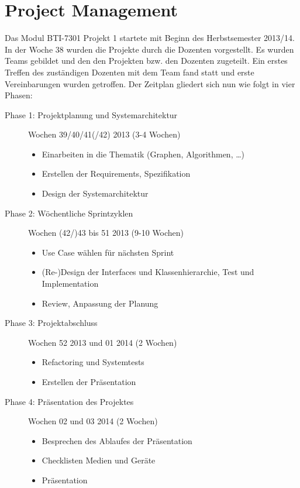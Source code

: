 \section{Project Management}
\label{sec:Project Management}
Das Modul BTI-7301 Projekt 1 startete mit Beginn des Herbstsemester 2013/14. In der Woche 38 wurden die Projekte durch die Dozenten vorgestellt. Es wurden Teams gebildet und den den Projekten bzw. den Dozenten zugeteilt. Ein erstes Treffen des zust\"andigen Dozenten mit dem Team fand statt und erste Vereinbarungen wurden getroffen. Der Zeitplan gliedert sich nun wie folgt in vier Phasen:
\begin{description}
  \item[Phase 1: Projektplanung und Systemarchitektur] Wochen 39/40/41(/42) 2013 (3-4 Wochen)
  \begin{itemize}
    \item Einarbeiten in die Thematik (Graphen, Algorithmen, \dots)
    \item Erstellen der Requirements, Spezifikation
    \item Design der Systemarchitektur
  \end{itemize}
  \item[Phase 2: W\"ochentliche Sprintzyklen] Wochen (42/)43 bis 51 2013 (9-10 Wochen)
  \begin{itemize}
    \item Use Case w\"ahlen f\"ur n\"achsten Sprint
    \item (Re-)Design der Interfaces und Klassenhierarchie, Test und Implementation
    \item Review, Anpassung der Planung
  \end{itemize}
  \item[Phase 3: Projektabschluss] Wochen 52 2013 und 01 2014 (2 Wochen)
  \begin{itemize}
    \item Refactoring und Systemtests
    \item Erstellen der Pr\"asentation
  \end{itemize}
  \item[Phase 4: Pr\"asentation des Projektes] Wochen 02 und 03 2014 (2 Wochen)
  \begin{itemize}
    \item Besprechen des Ablaufes der Pr\"asentation
    \item Checklisten Medien und Ger\"ate
    \item Pr\"asentation
  \end{itemize}
\end{description}